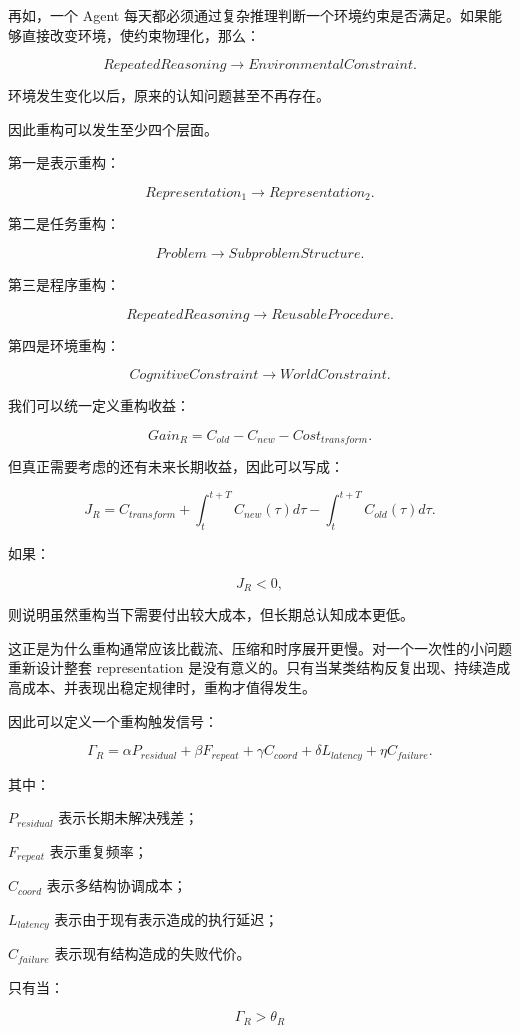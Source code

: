 再如，一个 Agent 每天都必须通过复杂推理判断一个环境约束是否满足。如果能够直接改变环境，使约束物理化，那么：

\[
RepeatedReasoning
\rightarrow
EnvironmentalConstraint.
\]

环境发生变化以后，原来的认知问题甚至不再存在。

因此重构可以发生至少四个层面。

第一是表示重构：

\[
Representation_1
\rightarrow
Representation_2.
\]

第二是任务重构：

\[
Problem
\rightarrow
SubproblemStructure.
\]

第三是程序重构：

\[
RepeatedReasoning
\rightarrow
ReusableProcedure.
\]

第四是环境重构：

\[
CognitiveConstraint
\rightarrow
WorldConstraint.
\]

我们可以统一定义重构收益：

\[
Gain_R
=
C_{old}
-
C_{new}
-
Cost_{transform}.
\]

但真正需要考虑的还有未来长期收益，因此可以写成：

\[
J_R
=
C_{transform}
+
\int_{t}^{t+T}
C_{new}(\tau)d\tau
-
\int_{t}^{t+T}
C_{old}(\tau)d\tau.
\]

如果：

\[
J_R<0,
\]

则说明虽然重构当下需要付出较大成本，但长期总认知成本更低。

这正是为什么重构通常应该比截流、压缩和时序展开更慢。对一个一次性的小问题重新设计整套 representation 是没有意义的。只有当某类结构反复出现、持续造成高成本、并表现出稳定规律时，重构才值得发生。

因此可以定义一个重构触发信号：

\[
\Gamma_R
=
\alpha P_{residual}
+
\beta F_{repeat}
+
\gamma C_{coord}
+
\delta L_{latency}
+
\eta C_{failure}.
\]

其中：

$P_{residual}$ 表示长期未解决残差；

$F_{repeat}$ 表示重复频率；

$C_{coord}$ 表示多结构协调成本；

$L_{latency}$ 表示由于现有表示造成的执行延迟；

$C_{failure}$ 表示现有结构造成的失败代价。

只有当：

\[
\Gamma_R>\theta_R
\]

